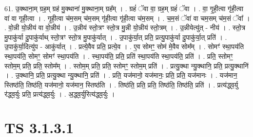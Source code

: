 \documentclass[17pt]{extarticle}
\begin{document}
61. उ॒क्थाना॒म् ग्रह॒म् ग्रह॑ मु॒क्थाना॑ मु॒क्थाना॒म् ग्रह᳚म् । . ग्रहं॑ ॅवा वा॒ ग्रह॒म् ग्रहं॑ ॅवा । . वा॒ गृ॒ही॒त्वा गृ॑ही॒त्वा वा॑ वा गृही॒त्वा । . गृ॒ही॒त्वा च॑म॒सम् च॑म॒सम् गृ॑ही॒त्वा गृ॑ही॒त्वा च॑म॒सम् । . च॒म॒सं ॅवा॑ वा चम॒सम् च॑म॒सं ॅवा᳚ । . वो॒न्नी यो॒न्नीय॑ वा वो॒न्नीय॑ । . उ॒न्नीय॑ स्तो॒त्रꣳ स्तो॒त्र मु॒न्नी यो॒न्नीय॑ स्तो॒त्रम् । . उ॒न्नीयेत्यु॑त् - नीय॑ । . स्तो॒त्र मु॒पाकु॑र्या दु॒पाकु॑र्याथ् स्तो॒त्रꣳ स्तो॒त्र मु॒पाकु॑र्यात् । . उ॒पाकु॑र्या॒त् प्रति॒ प्रत्यु॒पाकु॑र्या दु॒पाकु॑र्या॒त् प्रति॑ । . उ॒पाकु॑र्या॒दित्यु॑प - आकु॑र्यात् । . प्रत्ये॒वैव प्रति॒ प्रत्ये॒व । . ए॒व सोमꣳ॒॒ सोम॑ मे॒वैव सोम᳚म् । . सोमꣳ॑ स्था॒पय॑ति स्था॒पय॑ति॒ सोमꣳ॒॒ सोमꣳ॑ स्था॒पय॑ति । . स्था॒पय॑ति॒ प्रति॒ प्रति॑ स्था॒पय॑ति स्था॒पय॑ति॒ प्रति॑ । . प्रति॒ स्तोमꣳ॒॒ स्तोम॒म् प्रति॒ प्रति॒ स्तोम᳚म् । . स्तोम॒म् प्रति॒ प्रति॒ स्तोमꣳ॒॒ स्तोम॒म् प्रति॑ । . प्रत्यु॒क्था न्यु॒क्थानि॒ प्रति॒ प्रत्यु॒क्थानि॑ । . उ॒क्थानि॒ प्रति॒ प्रत्यु॒क्था न्यु॒क्थानि॒ प्रति॑ । . प्रति॒ यज॑मानो॒ यज॑मानः॒ प्रति॒ प्रति॒ यज॑मानः । . यज॑मान॒ स्तिष्ठ॑ति॒ तिष्ठ॑ति॒ यज॑मानो॒ यज॑मान॒ स्तिष्ठ॑ति । . तिष्ठ॑ति॒ प्रति॒ प्रति॒ तिष्ठ॑ति॒ तिष्ठ॑ति॒ प्रति॑ । . प्रत्य॑द्ध्व॒र्यु र॑द्ध्व॒र्युः प्रति॒ प्रत्य॑द्ध्व॒र्युः । . अ॒द्ध्व॒र्युरित्य॑द्ध्व॒र्युः । \newline
\pagebreak
{}

\section{ TS 3.1.3.1 }
\end{document}
